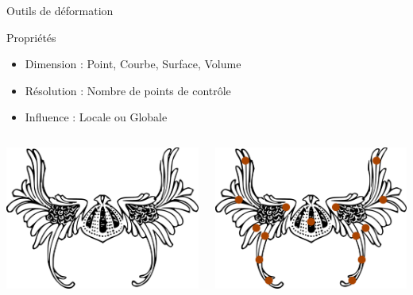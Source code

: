 \documentclass[xcolor=x11names,compress]{beamer}
\renewcommand{\(}{\begin{columns}} \renewcommand{\)}{\end{columns}}
\newcommand{\<}[1]{\begin{column}{#1}} \renewcommand{\>}{\end{column}}
\begin{document}
\begin{frame}{Outils de déformation}
  \begin{exampleblock}{Propriétés}
    \begin{itemize}
      \item Dimension : Point, Courbe, Surface, Volume
      \item Résolution : Nombre de points de contrôle
      \item Influence : Locale ou Globale
    \end{itemize}
  \end{exampleblock}
  \pause
  \begin{columns}[t]
    \begin{column}{0.5\textwidth}
      \centering
      \includegraphics[scale=0.1]{Outil-Mono-Sans}
    \end{column}
    \pause
    \begin{column}{0.5\textwidth}
      \centering
      \includegraphics[scale=0.1]{Outil-Mono-Points}

\end{column}
\end{columns}
\end{frame}
\end{document}
